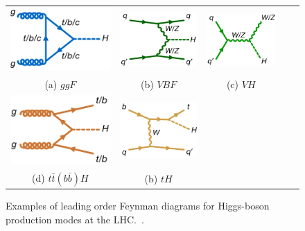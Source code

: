 \documentclass[11pt,twoside]{book}
\begin{document}
\begin{figure}
\begin{center}
\begin{tabular}{ccc|cc}
\centering
\includegraphics[width=0.3\linewidth,H]{images/ggF.png}  &
\includegraphics[width=0.3\linewidth,H]{images/VBF.png}  &
\includegraphics[width=0.3\linewidth,H]{images/VH.png} \\
(a) $ggF$ & (b) $VBF$ & (c) $VH$ \\
\includegraphics[width=0.3\linewidth,H]{images/ttH.png} &
\includegraphics[width=0.3\linewidth,H]{images/tH.png} \\
(d) $t\bar{t}(b\bar{b})H$ & (b) $tH$ \\

\end{tabular}
\caption{\label{coupl}
Examples of leading order Feynman diagrams for Higgs-boson production modes at the LHC.~\cite{NATURE}.
}
\end{center}
\end{figure}
\end{document}
